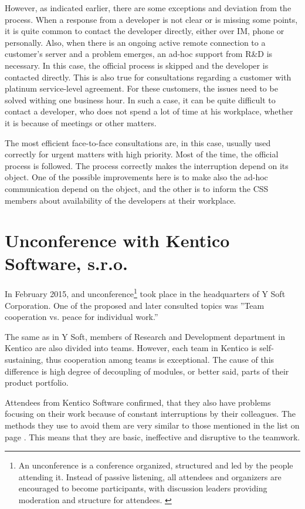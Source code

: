 \documentclass[11pt,singleside]{myfithesis2}
\begin{document}
However, as indicated earlier, there are some exceptions and deviation from the process. When a response from a developer is not clear or is missing some points, it is quite common to contact the developer directly, either over IM, phone or personally. Also, when there is an ongoing active remote connection to a customer's server and a problem emerges, an ad-hoc support from R\&D is necessary. In this case, the official process is skipped and the developer is contacted directly. This is also true for consultations regarding a customer with platinum service-level agreement. For these customers, the issues need to be solved withing one business hour. In such a case, it can be quite difficult to contact a developer, who does not spend a lot of time at his workplace, whether it is because of meetings or other matters.

The most efficient face-to-face consultations are, in this case, usually used correctly for urgent matters with high priority. Most of the time, the official process is followed. The process correctly makes the interruption depend on its object. One of the possible improvements here is to make also the ad-hoc communication depend on the object, and the other is to inform the CSS members about availability of the developers at their workplace.


	\section{Unconference with Kentico Software, s.r.o.}\label{Kentico}
In February 2015, and unconference\footnote{An unconference is a conference organized, structured and led by the people attending it. Instead of passive listening, all attendees and organizers are encouraged to become participants, with discussion leaders providing moderation and structure for attendees. \cite{unconference}} took place in the headquarters of Y Soft Corporation. One of the proposed and later consulted topics was ''Team cooperation vs. peace for individual work.''

The same as in Y Soft, members of Research and Development department in Kentico are also divided into teams. However, each team in Kentico is self-sustaining, thus cooperation among teams is exceptional. The cause of this difference is high degree of decoupling of modules, or better said, parts of their product portfolio.

Attendees from Kentico Software confirmed, that they also have problems focusing on their work because of constant interruptions by their colleagues. The methods they use to avoid them are very similar to those mentioned in the list on page \pageref{list:avoidingCommunication}. This means that they are basic, ineffective and disruptive to the teamwork.
\end{document}
